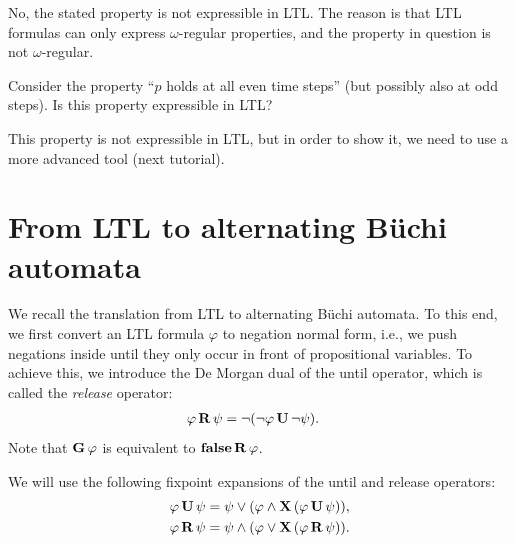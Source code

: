 \begin{solution}
	No, the stated property is not expressible in LTL.
	The reason is that LTL formulas can only express $\omega$-regular properties,
	and the property in question is not $\omega$-regular.
\end{solution}

\begin{exercise}
	Consider the property
	``$p$ holds at all even time steps'' (but possibly also at odd steps).
	Is this property expressible in LTL?
\end{exercise}

\begin{solution}
	This property is not expressible in LTL,
	but in order to show it, we need to use a more advanced tool (next tutorial).
\end{solution}

\section*{From LTL to alternating Büchi automata}

We recall the translation from LTL to alternating Büchi automata.
%
To this end, we first convert an LTL formula $\varphi$ to negation normal form,
i.e., we push negations inside until they only occur in front of propositional variables.
%
To achieve this, we introduce the De Morgan dual of the until operator, which is called the \emph{release} operator:
%
\begin{align*}
	\varphi \,\mathbf R\, \psi &= \neg (\neg \varphi \,\mathbf U\, \neg \psi).
\end{align*}
%
Note that $\mathbf G\, \varphi$ is equivalent to $\mathbf{false} \,\mathbf R\, \varphi$.

We will use the following fixpoint expansions of the until and release operators:
%
\begin{align}
	\label{eq:fixpoint expansions U}
	\varphi \,\mathbf U\, \psi
		&= \psi \vee (\varphi \wedge \mathbf X\, (\varphi \,\mathbf U\, \psi)), \\
	\label{eq:fixpoint expansions R}
	\varphi \,\mathbf R\, \psi
		&= \psi \wedge (\varphi \vee \mathbf X\, (\varphi \,\mathbf R\, \psi)).
\end{align}

